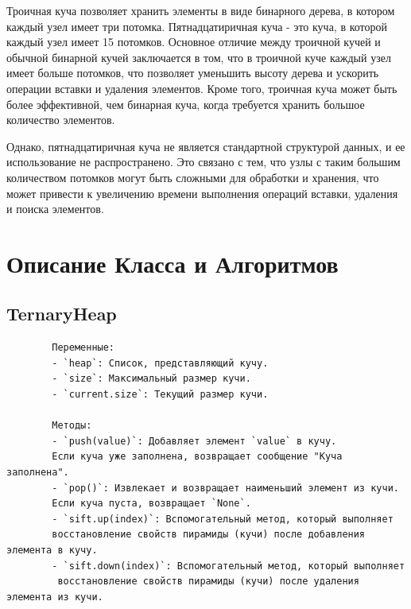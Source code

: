\documentclass[a4paper, 12pt]{article}
\theoremstyle{definition}
\begin{document}
	Троичная куча позволяет хранить элементы в виде бинарного дерева, в котором каждый узел имеет три потомка. Пятнадцатиричная куча - это куча, в которой каждый узел имеет 15 потомков. Основное отличие между троичной кучей и обычной бинарной кучей заключается в том, что в троичной куче каждый узел имеет больше потомков, что позволяет уменьшить высоту дерева и ускорить операции вставки и удаления элементов. Кроме того, троичная куча может быть более эффективной, чем бинарная куча, когда требуется хранить большое количество элементов. \newline
	
	Однако, пятнадцатиричная куча не является стандартной структурой данных, и ее использование не распространено. Это связано с тем, что узлы с таким большим количеством потомков могут быть сложными для обработки и хранения, что может привести к увеличению времени выполнения операций вставки, удаления и поиска элементов.
	\newpage
	\section{Описание Класса и Алгоритмов}
	\subsection{TernaryHeap}
	\begin{verbatim}
		Переменные:
		- `heap`: Список, представляющий кучу.
		- `size`: Максимальный размер кучи.
		- `current.size`: Текущий размер кучи.
		
		Методы:
		- `push(value)`: Добавляет элемент `value` в кучу.
		Если куча уже заполнена, возвращает сообщение "Куча заполнена".
		- `pop()`: Извлекает и возвращает наименьший элемент из кучи.
		Если куча пуста, возвращает `None`.
		- `sift.up(index)`: Вспомогательный метод, который выполняет 
		восстановление свойств пирамиды (кучи) после добавления элемента в кучу.
		- `sift.down(index)`: Вспомогательный метод, который выполняет
		 восстановление свойств пирамиды (кучи) после удаления элемента из кучи.
	\end{verbatim}
\end{document}
